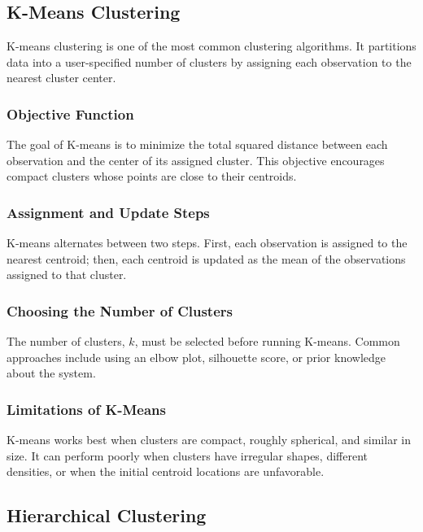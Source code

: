 \documentclass[12pt,letter]{article}
\begin{document}
\subsection{K-Means Clustering}

K-means clustering is one of the most common clustering algorithms. It partitions data into a user-specified number of clusters by assigning each observation to the nearest cluster center.

\subsubsection{Objective Function}

The goal of K-means is to minimize the total squared distance between each observation and the center of its assigned cluster. This objective encourages compact clusters whose points are close to their centroids.

\subsubsection{Assignment and Update Steps}

K-means alternates between two steps. First, each observation is assigned to the nearest centroid; then, each centroid is updated as the mean of the observations assigned to that cluster.

\subsubsection{Choosing the Number of Clusters}

The number of clusters, \(k\), must be selected before running K-means. Common approaches include using an elbow plot, silhouette score, or prior knowledge about the system.

\subsubsection{Limitations of K-Means}

K-means works best when clusters are compact, roughly spherical, and similar in size. It can perform poorly when clusters have irregular shapes, different densities, or when the initial centroid locations are unfavorable.


\subsection{Hierarchical Clustering}
\end{document}
